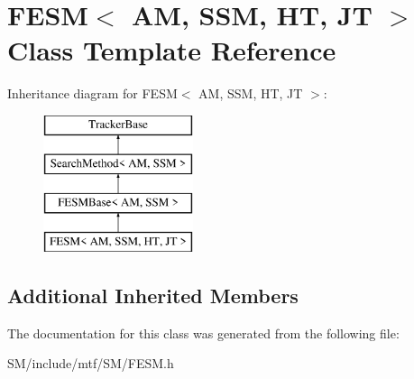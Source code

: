 \hypertarget{classFESM}{\section{F\-E\-S\-M$<$ A\-M, S\-S\-M, H\-T, J\-T $>$ Class Template Reference}
\label{classFESM}
}
Inheritance diagram for F\-E\-S\-M$<$ A\-M, S\-S\-M, H\-T, J\-T $>$\-:\begin{figure}[H]
\begin{center}
\leavevmode
\includegraphics[height=4.000000cm]{classFESM}
\end{center}
\end{figure}
\subsection*{Additional Inherited Members}


The documentation for this class was generated from the following file\-:\begin{DoxyCompactItemize}
\item 
S\-M/include/mtf/\-S\-M/F\-E\-S\-M.\-h\end{DoxyCompactItemize}
